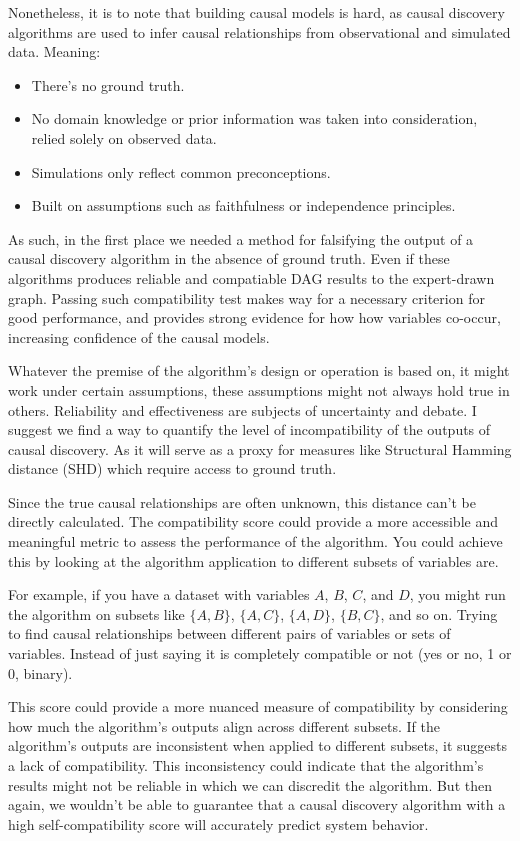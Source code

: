 \documentclass{article}
\begin{document}
Nonetheless, it is to note that building causal models is hard, as causal discovery algorithms are used to infer causal
relationships from observational and simulated data. Meaning:
\begin{itemize}
  \item There's no ground truth.
  \item No domain knowledge or prior information was taken into consideration, relied solely on observed data.
  \item Simulations only reflect common preconceptions.
  \item Built on assumptions such as faithfulness or independence principles. 
\end{itemize}

As such, in the first place we needed a method for falsifying the output of a causal discovery algorithm in the absence of ground truth.
Even if these algorithms produces reliable and compatiable DAG results to the expert-drawn graph.
Passing such compatibility test makes way for a necessary criterion for good performance, and provides strong evidence for how how variables co-occur, increasing confidence of the causal models.

Whatever the premise of the algorithm's design or operation is based on, it might work under certain assumptions, these assumptions might not always hold true in others. Reliability and effectiveness are subjects of uncertainty and debate.
I suggest we find a way to quantify the level of incompatibility of the outputs of causal discovery. As it will serve as a proxy for measures like Structural Hamming distance (SHD) which require access to ground truth.

Since the true causal relationships are often unknown, this distance can't be directly calculated. 
The compatibility score could provide a more accessible and meaningful metric to assess the performance of the algorithm.
You could achieve this by looking at the algorithm application to different subsets of variables are.

For example, if you have a dataset with variables $A$, $B$, $C$, and $D$, you might run the algorithm on subsets like $\{A, B\}$, $\{A, C\}$, $\{A, D\}$, $\{B, C\}$, and so on. Trying to find causal relationships between different pairs of variables or sets of variables.
Instead of just saying it is completely compatible or not (yes or no, 1 or 0, binary).

This score could provide a more nuanced measure of compatibility by considering how much the algorithm's outputs align across different subsets.
If the algorithm's outputs are inconsistent when applied to different subsets, it suggests a lack of compatibility. 
This inconsistency could indicate that the algorithm's results might not be reliable in which we can discredit the algorithm.
But then again, we wouldn't be able to guarantee that a causal discovery algorithm with a high self-compatibility score will accurately predict system behavior.
\end{document}
